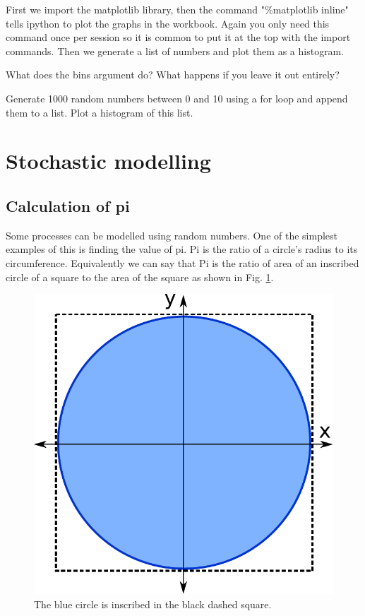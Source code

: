 		First we import the matplotlib library, then the command "\%matplotlib inline" tells ipython to plot the graphs in the workbook. Again you only need this command once per session so it is common to put it at the top with the import commands. Then we generate a list of numbers and plot them as a histogram.
		\begin{task}What does the bins argument do? What happens if you leave it out entirely?\end{task}
		\begin{task}Generate 1000 random numbers between 0 and 10 using a for loop and append them to a list. Plot a histogram of this list.\end{task}

\section{Stochastic modelling}
	\subsection{Calculation of pi}
		Some processes can be modelled using random numbers. One of the simplest examples of this is finding the value of pi. Pi is the ratio of a circle's radius to its circumference. Equivalently we can say that Pi is the ratio of area of an inscribed circle of a square to the area of the square as shown in Fig. \ref{fig:picircle}. 
	\begin{figure}[h]
		\centering
		\includegraphics[scale=0.4]{images/pi}
		\caption{The blue circle is inscribed in the black dashed square.}
		\label{fig:picircle}
	\end{figure}


